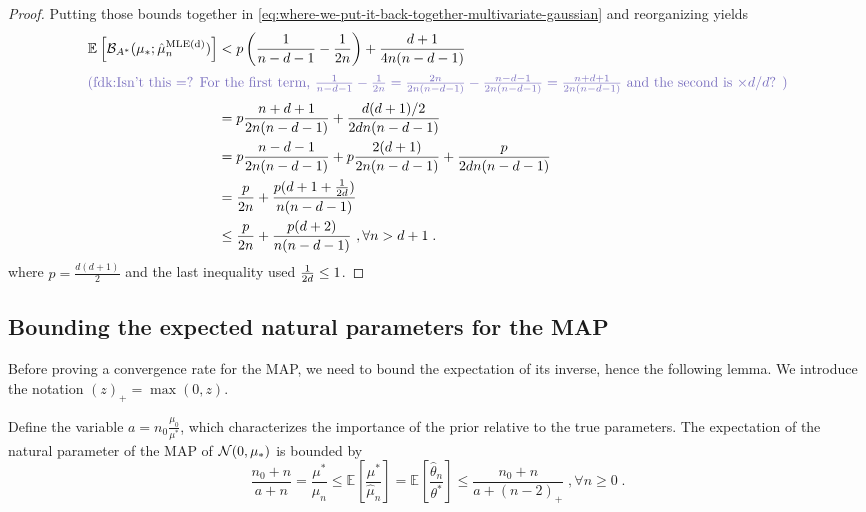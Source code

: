 \documentclass[twoside]{article}
\newcommand{\fdk}[1]{\textcolor{Periwinkle}{(fdk:#1)}}
\newcommand*{\expect}[2][]{\ensuremath{\mathbb{E}_{#1} \left[ #2 \right] }} %
\newcommand{\logpart}{A}
\newcommand{\bregmanconj}{\cB_{\logpart^*}}
\newcommand{\nat}{\theta}
\newcommand{\m}{\mu}
\newcommand{\MAPm}{\hat \m_n}
\newcommand{\MAPt}{\hat \nat_n}
\begin{document}
\begin{proof}
Putting those bounds together in 
\cref{eq:where-we-put-it-back-together-multivariate-gaussian}
and reorganizing yields
\begin{align}
 	\expect{\bregmanconj( \mu_*; \hat \mu_n^\text{MLE(d)})}
 	&< p \paren{ \inv{n-d-1} - \inv{2n}}  + \frac{d + 1}{4n(n - d - 1)}\\
 	\intertext{\fdk{Isn't this =?
 	For the first term, $\inv{n-d-1} - \inv{2n} = \frac{2n}{2n(n-d-1)} - \frac{n-d-1}{2n(n-d-1)} = \frac{n+d+1}{2n(n-d-1)}$ and the second is $\times d/d$?
 	}}
 	&= p \frac{n + d +1}{2 n (n-d-1)}  + \frac{d(d + 1)/2}{2dn(n - d - 1)}\\
 	&= p\frac{n-d-1}{2n(n-d-1)} + p\frac{2(d+1)}{2 n (n-d-1)} + \frac{p}{2dn (n - d - 1)}\\
 	&= \frac{p}{2n} + \frac{p(d+ 1 + \inv{2d})}{n (n-d-1)} \\
 	&\leq \frac{p}{2n} + \frac{p(d+2)}{n (n - d -1)}
 	\ , \forall n >d+1 \;.
\end{align}
where $p = \frac{d(d+1)}{2}$ and the last inequality used $\frac{1}{2d}\leq 1$. 
\end{proof}

\subsection{Bounding the expected natural parameters for the MAP}
Before proving a convergence rate for the MAP, we need to bound the expectation of its inverse, hence the following lemma.
We introduce the notation $(z)_+ = \max(0,z)$.
\begin{lemma}\label{lem:expected-map-natural-parameter-gaussian}
	Define the variable $a = n_0 \frac{\mu_0}{\mu^*}$, which characterizes 
	the importance of the prior relative to the true parameters.
	The expectation of the natural parameter of the MAP of ${\mathcal N}(0,\mu_*)$ is bounded by
\begin{equation}
		\frac{n_0+n}{a+n}
		=\frac{\mu^*}{\mu_n}
		\leq \expect{\frac{\mu^*}{\MAPm}} 
		= \expect{\frac{\MAPt}{\nat^*}} 
		\leq
		\frac{n_0 +n}{a+(n-2)_+} \; , \forall n\geq 0 \; .
		\label{eq:lemma_nat_bound}
	\end{equation}
\end{lemma}
\end{document}
